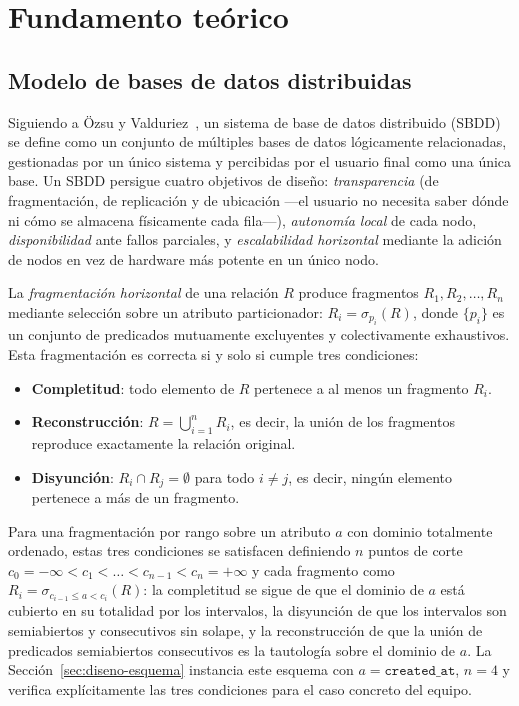 \documentclass[11pt,letterpaper]{article}
\begin{document}
\section{Fundamento teórico}
\label{sec:fundamento-teorico}

\subsection{Modelo de bases de datos distribuidas}

Siguiendo a Özsu y Valduriez~\cite{ozsu2011principles}, un sistema de base de datos distribuido
(SBDD) se define como un conjunto de múltiples bases de datos lógicamente relacionadas,
gestionadas por un único sistema y percibidas por el usuario final como una única base. Un SBDD
persigue cuatro objetivos de diseño: \emph{transparencia} (de fragmentación, de replicación y de
ubicación —el usuario no necesita saber dónde ni cómo se almacena físicamente cada fila—),
\emph{autonomía local} de cada nodo, \emph{disponibilidad} ante fallos parciales, y
\emph{escalabilidad horizontal} mediante la adición de nodos en vez de hardware más potente en un
único nodo.

La \emph{fragmentación horizontal} de una relación $R$ produce fragmentos $R_1, R_2, \dots, R_n$
mediante selección sobre un atributo particionador: $R_i = \sigma_{p_i}(R)$, donde $\{p_i\}$ es un
conjunto de predicados mutuamente excluyentes y colectivamente exhaustivos. Esta fragmentación es
correcta si y solo si cumple tres condiciones:

\begin{itemize}[leftmargin=1.5em]
    \item \textbf{Completitud}: todo elemento de $R$ pertenece a al menos un fragmento $R_i$.
    \item \textbf{Reconstrucción}: $R = \bigcup_{i=1}^{n} R_i$, es decir, la unión de los
        fragmentos reproduce exactamente la relación original.
    \item \textbf{Disyunción}: $R_i \cap R_j = \emptyset$ para todo $i \neq j$, es decir, ningún
        elemento pertenece a más de un fragmento.
\end{itemize}

Para una fragmentación por rango sobre un atributo $a$ con dominio totalmente ordenado, estas tres
condiciones se satisfacen definiendo $n$ puntos de corte $c_0 = -\infty < c_1 < \dots < c_{n-1} <
c_n = +\infty$ y cada fragmento como $R_i = \sigma_{c_{i-1} \leq a < c_i}(R)$: la completitud se
sigue de que el dominio de $a$ está cubierto en su totalidad por los intervalos, la disyunción de
que los intervalos son semiabiertos y consecutivos sin solape, y la reconstrucción de que la unión
de predicados semiabiertos consecutivos es la tautología sobre el dominio de $a$. La
Sección~\ref{sec:diseno-esquema} instancia este esquema con $a = \texttt{created\_at}$, $n = 4$ y
verifica explícitamente las tres condiciones para el caso concreto del equipo.
\end{document}
